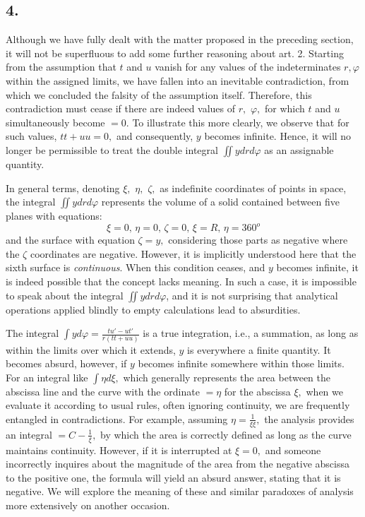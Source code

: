 \documentclass[14pt]{memoir}
\theoremstyle{plain}
\theoremstyle{remark}
\begin{document}
\subsection*{4.}

Although we have fully dealt with the matter proposed in the preceding section, it will not be superfluous to add some further reasoning about art. 2. Starting from the assumption that \(t\) and \(u\) vanish for any values of the indeterminates \(r, \varphi\) within the assigned limits, we have fallen into an inevitable contradiction, from which we concluded the falsity of the assumption itself. Therefore, this contradiction must cease if there are indeed values of \(r,\) \(\varphi,\) for which \(t\) and \(u\) simultaneously become \(=0.\) To illustrate this more clearly, we observe that for such values, \(tt+uu=0,\) and consequently, \(y\) becomes infinite. Hence, it will no longer be permissible to treat the double integral \(\iint y drd\varphi\) as an assignable quantity.

In general terms, denoting \(\xi,\) \(\eta,\) \(\zeta,\) as indefinite coordinates of points in space, the integral \(\iint ydrd\varphi\) represents the volume of a solid contained between five planes with equations:
\[ \xi=0\text{, }\eta=0\text{, }\zeta=0\text{, }\xi=R\text{, }\eta=360^o \]
and the surface with equation \(\zeta=y,\) considering those parts as negative where the \(\zeta\) coordinates are negative. However, it is implicitly understood here that the sixth surface is \textit{continuous}. When this condition ceases, and \(y\) becomes infinite, it is indeed possible that the concept lacks meaning. In such a case, it is impossible to speak about the integral \(\iint y drd\varphi\), and it is not surprising that analytical operations applied blindly to empty calculations lead to absurdities.

The integral \(\int y d\varphi = \frac{tu' - ut'}{r(tt + uu)}\) is a true integration, i.e., a summation, as long as within the limits over which it extends, \(y\) is everywhere a finite quantity. It becomes absurd, however, if \(y\) becomes infinite somewhere within those limits. For an integral like \(\int \eta d\xi,\) which generally represents the area between the abscissa line and the curve with the ordinate \(=\eta\) for the abscissa \(\xi,\) when we evaluate it according to usual rules, often ignoring continuity, we are frequently entangled in contradictions. For example, assuming \(\eta = \frac{1}{\xi\xi},\) the analysis provides an integral \(= C - \frac{1}{\xi},\) by which the area is correctly defined as long as the curve maintains continuity. However, if it is interrupted at \(\xi = 0,\) and someone incorrectly inquires about the magnitude of the area from the negative abscissa to the positive one, the formula will yield an absurd answer, stating that it is negative. We will explore the meaning of these and similar paradoxes of analysis more extensively on another occasion.
\end{document}

